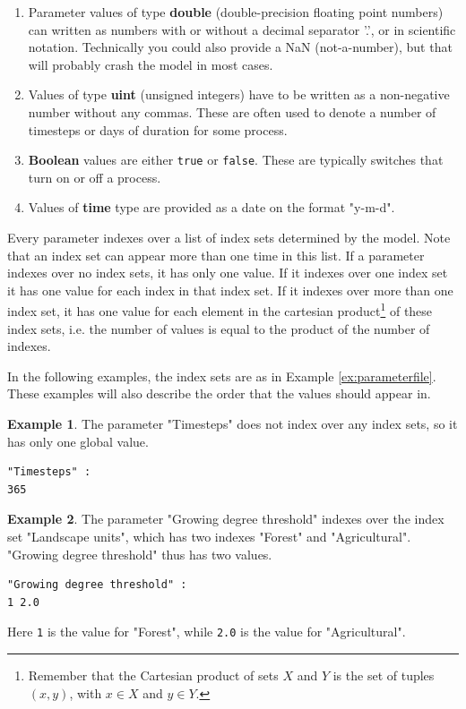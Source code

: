 \documentclass[11pt]{article}
\theoremstyle{definition}
\newtheorem{myexample}{Example}
\newenvironment{example}%
  {\begin{lrbox}{\examplebox}%
   \begin{minipage}{\dimexpr\linewidth-2\fboxsep}
   \begin{myexample}}%
  {\end{myexample}%
   \end{minipage}%
   \end{lrbox}%
   \begin{trivlist}
     \item[]\colorbox{silver}{\usebox\examplebox}
   \end{trivlist}}
\begin{document}
\begin{enumerate}[i]
\item Parameter values of type {\bf double} (double-precision floating point numbers) can written as numbers with or without a decimal separator '.', or in scientific notation. Technically you could also provide a NaN (not-a-number), but that will probably crash the model in most cases.
\item Values of type {\bf uint} (unsigned integers) have to be written as a non-negative number without any commas. These are often used to denote a number of timesteps or days of duration for some process.
\item {\bf Boolean} values are either {\tt true} or {\tt false}. These are typically switches that turn on or off a process.
\item Values of {\bf time} type are provided as a date on the format "y-m-d".
\end{enumerate}

Every parameter indexes over a list of index sets determined by the model. Note that an index set can appear more than one time in this list. If a parameter indexes over no index sets, it has only one value. If it indexes over one index set it has one value for each index in that index set. If it indexes over more than one index set, it has one value for each element in the cartesian product\footnote{Remember that the Cartesian product of sets $X$ and $Y$ is the set of tuples $(x, y)$, with $x\in X$ and $y\in Y$.} of these index sets, i.e. the number of values is equal to the product of the number of indexes.

In the following examples, the index sets are as in Example \ref{ex:parameterfile}. These examples will also describe the order that the values should appear in.

\begin{example}
The parameter "Timesteps" does not index over any index sets, so it has only one global value.
\begin{lstlisting}
"Timesteps" :
365
\end{lstlisting}
\end{example}

\begin{example}
The parameter "Growing degree threshold" indexes over the index set "Landscape units", which has two indexes "Forest" and "Agricultural". "Growing degree threshold" thus has two values.
\begin{lstlisting}
"Growing degree threshold" :
1 2.0
\end{lstlisting}
Here {\tt 1} is the value for "Forest", while {\tt 2.0} is the value for "Agricultural".
\end{example}
\end{document}
